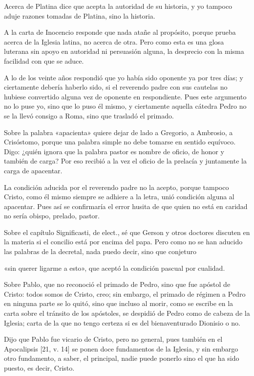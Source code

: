 Acerca de Platina dice que acepta la autoridad de su historia, y yo tampoco aduje razones tomadas de Platina, sino la historia.

A la carta de Inocencio responde que nada atañe al propósito, porque prueba acerca de la Iglesia latina, no acerca de otra. Pero como esta es una glosa luterana sin apoyo en autoridad ni persuasión alguna, la desprecio con la misma facilidad con que se aduce.

A lo de los veinte años respondió que yo había sido oponente ya por tres días; y ciertamente debería haberlo sido, si el reverendo padre con sus cautelas no hubiese convertido alguna vez de opo\marginpar{\small[312]}nente en respondiente. Pues este argumento no lo puse yo, sino que lo puso él mismo, y ciertamente aquella cátedra Pedro no se la llevó consigo a Roma, sino que trasladó el primado.

Sobre la palabra «apacienta» quiere dejar de lado a Gregorio, a Ambrosio, a Crisóstomo, porque una palabra simple no debe tomarse en sentido equívoco. Digo: ¿quién ignora que la palabra pastor es nombre de oficio, de honor y también de carga? Por eso recibió a la vez el oficio de la prelacía y juntamente la carga de apacentar.

La condición aducida por el reverendo padre no la acepto, porque tampoco Cristo, como él mismo siempre se adhiere a la letra, unió condición alguna al apacentar. Pues así se confirmaría el error husita de que quien no está en caridad no sería obispo, prelado, pastor.

Sobre el capítulo Significasti, de elect., sé que Gerson y otros doctores discuten en la materia si el concilio está por encima del papa. Pero como no se han aducido las palabras de la decretal, nada puedo decir, sino que conjeturo

«sin querer ligarme a esto», que aceptó la condición pascual por cualidad.

Sobre Pablo, que no reconoció el primado de Pedro, sino que fue apóstol de Cristo: todos somos de Cristo, creo; sin embargo, el primado de régimen a Pedro en ninguna parte se lo quitó, sino que incluso al morir, como se escribe en la carta sobre el tránsito de los apóstoles, se despidió de Pedro como de cabeza de la Iglesia; carta de la que no tengo certeza si es del bienaventurado Dionisio o no.

Dijo que Pablo fue vicario de Cristo, pero no general, pues también en el Apocalipsis [21, v. 14] se ponen doce fundamentos de la Iglesia, y sin embargo otro fundamento, a saber, el principal, nadie puede ponerlo sino el que ha sido puesto, es decir, Cristo.

